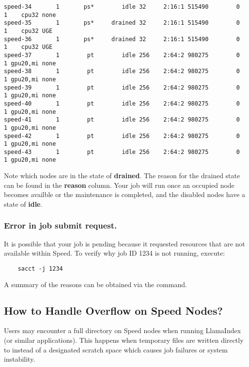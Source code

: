 \begin{verbatim}
speed-34       1       ps*        idle 32     2:16:1 515490        0      1    cpu32 none
speed-35       1       ps*     drained 32     2:16:1 515490        0      1    cpu32 UGE
speed-36       1       ps*     drained 32     2:16:1 515490        0      1    cpu32 UGE
speed-37       1        pt        idle 256    2:64:2 980275        0      1 gpu20,mi none
speed-38       1        pt        idle 256    2:64:2 980275        0      1 gpu20,mi none
speed-39       1        pt        idle 256    2:64:2 980275        0      1 gpu20,mi none
speed-40       1        pt        idle 256    2:64:2 980275        0      1 gpu20,mi none
speed-41       1        pt        idle 256    2:64:2 980275        0      1 gpu20,mi none
speed-42       1        pt        idle 256    2:64:2 980275        0      1 gpu20,mi none
speed-43       1        pt        idle 256    2:64:2 980275        0      1 gpu20,mi none
\end{verbatim}
\normalsize

\noindent Note which nodes are in the state of \textbf{drained}.
The reason for the drained state can be found in the \textbf{reason} column.
Your job will run once an occupied node becomes availble or the maintenance is completed,
and the disabled nodes have a state of \textbf{idle}.

\subsubsection{Error in job submit request.}
It is possible that your job is pending because it requested resources that are not available within Speed. 
To verify why job ID 1234 is not running, execute:
\begin{verbatim}
	sacct -j 1234
\end{verbatim}

\noindent A summary of the reasons can be obtained via the  command.

\subsection{How to Handle  Overflow on Speed Nodes?}
\label{sect:faq-tmp-on-speed}

Users may encounter a full  directory on Speed nodes when running LlamaIndex (or similar applications).
This happens when temporary files are written directly to  instead of a designated scratch space which causes job failures or system instability.

